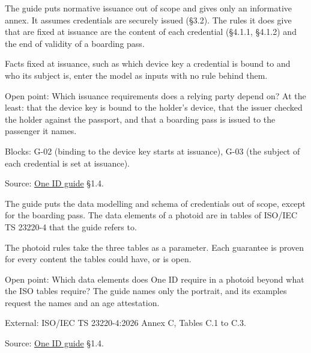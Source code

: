 \begin{definition}
  \label{def:c03}
  \notready
  The guide puts normative issuance out of scope and gives only an
  informative annex. It assumes credentials are securely issued (§3.2). The
  rules it does give that are fixed at issuance are the content of each
  credential (§4.1.1, §4.1.2) and the end of validity of a boarding pass.

  Facts fixed at issuance, such as which device key a credential is bound to
  and who its subject is, enter the model as inputs with no rule behind them.

  Open point: Which issuance requirements does a relying party depend on? At
  the least: that the device key is bound to the holder's device, that the
  issuer checked the holder against the passport, and that a boarding pass is
  issued to the passenger it names.

  Blocks: G-02 (binding to the device key starts at issuance), G-03 (the
  subject of each credential is set at issuance).

  Source:
  \href{https://standards.atlassian.net/wiki/spaces/OneID/pages/2947416082/Technical+Implementation+Guide}{One
  ID guide} §1.4.
\end{definition}

\begin{definition}
  \label{def:c04}
  \notready
  The guide puts the data modelling and schema of credentials out of scope,
  except for the boarding pass. The data elements of a photoid are in tables
  of ISO/IEC TS 23220-4 that the guide refers to.

  The photoid rules take the three tables as a parameter. Each guarantee is
  proven for every content the tables could have, or is open.

  Open point: Which data elements does One ID require in a photoid beyond
  what the ISO tables require? The guide names only the portrait, and its
  examples request the names and an age attestation.

  External: ISO/IEC TS 23220-4:2026 Annex C, Tables C.1 to C.3.

  Source:
  \href{https://standards.atlassian.net/wiki/spaces/OneID/pages/2947416082/Technical+Implementation+Guide}{One
  ID guide} §1.4.
\end{definition}


